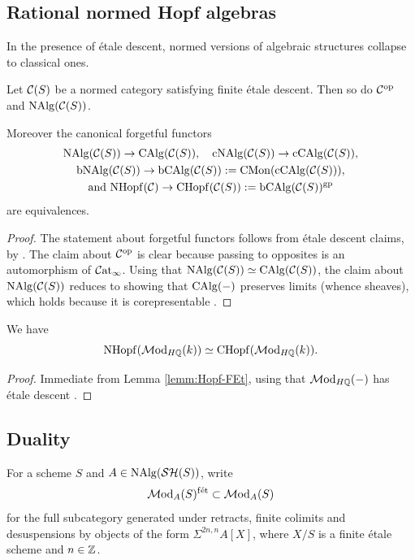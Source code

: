 \documentclass{amsart}
\numberwithin{proposition}{section}
\numberwithin{equation}{section}
\def\fet{\mathrm{f\acute et}}
\def\NHopf{\mathrm{NHopf}}
\def\CHopf{\mathrm{CHopf}}
\def\cNAlg{\mathrm{cNAlg}}
\def\bNAlg{\mathrm{bNAlg}}
\def\cCAlg{\mathrm{cCAlg}}
\begin{document}
\subsection{Rational normed Hopf algebras}
In the presence of étale descent, normed versions of algebraic structures collapse to classical ones.
\begin{lemma} \label{lemm:Hopf-FEt}
Let $\mathcal C(S)$ be a normed category satisfying finite étale descent.
Then so do $\mathcal C^{\mathrm{op}}$ and $\mathrm{NAlg}(\mathcal C(S))$.

Moreover the canonical forgetful functors \begin{gather*} \NAlg(\scr C(S)) \to \CAlg(\scr C(S)), \quad \cNAlg(\scr C(S)) \to \cCAlg(\scr C(S)), \\ \bNAlg(\scr C(S)) \to \mathrm{bCAlg}(\scr C(S)) := \CMon(\cCAlg(\scr C(S))), \\ \text{and } \NHopf(\scr C) \to \CHopf(\scr C(S)) := \mathrm{bCAlg}(\scr C(S))^\gp \end{gather*} are equivalences.
\end{lemma}
\begin{proof}
The statement about forgetful functors follows from étale descent claims, by \cite[Corollary C.16]{bachmann-norms}.
The claim about $\mathcal C^{\mathrm{op}}$ is clear because passing to opposites is an automorphism of $\mathcal{C}\mathrm{at}{}_\infty$.
Using that $\mathrm{NAlg}(\mathcal C(S)) \simeq \mathrm{CAlg}(\mathcal C(S))$, the claim about $\mathrm{NAlg}(\mathcal C(S))$ reduces to showing that $\mathrm{CAlg}(\mathord-)$ preserves limits (whence sheaves), which holds because it is corepresentable \cite[Proposition 2.2.4.9]{lurie-ha}.
\end{proof}

\begin{corollary}
We have \[ \NHopf(\Mod_{H\Q}(k)) \wequi \CHopf(\Mod_{H\Q}(k)). \]
\end{corollary}
\begin{proof}
Immediate from Lemma \ref{lemm:Hopf-FEt}, using that $\mathcal{M}\mathrm{od}_{H\mathbb{Q}}(\mathord-)$ has étale descent \cite[Theorem~14.3.4(1)]{triangulated-mixed-motives}.
\end{proof}


\subsection{Duality} \label{subsec:duality}
For a scheme $S$ and $A \in \mathrm{NAlg}(\mathcal{SH}(S))$, write \[ \Mod_A(S)^\fet \subset \Mod_A(S) \] for the full subcategory generated under retracts, finite colimits and desuspensions by objects of the form $\Sigma^{2n,n}A[X]$, where $X/S$ is a finite étale scheme and $n \in \mathbb{Z}$.
\end{document}
